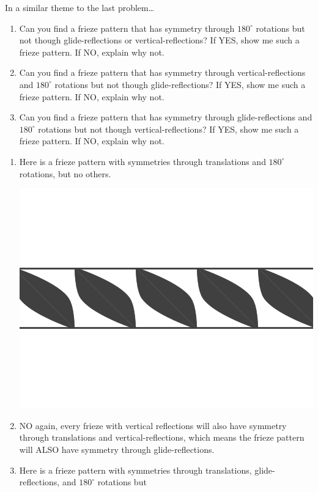 \documentclass[noauthor,nooutcomes,12pt,hints,handout]{ximera}
\begin{document}
\begin{question}
  In a similar theme to the last problem\dots 
  \begin{enumerate}
    \item Can you find a frieze pattern that has symmetry through
      $180^\circ$ rotations but not though glide-reflections or
      vertical-reflections? If YES, show me such a frieze pattern. If
      NO, explain why not.
      
    \item Can you find a frieze pattern that has symmetry through
      vertical-reflections and $180^\circ$ rotations but not though
      glide-reflections? If YES, show me such a frieze pattern. If NO,
      explain why not.

    \item Can you find a frieze pattern that has symmetry through
      glide-reflections and $180^\circ$ rotations but not though
      vertical-reflections? If YES, show me such a frieze pattern. If
      NO, explain why not.
  \end{enumerate}
  \begin{freeResponse}
    \begin{enumerate}
    \item Here is a frieze pattern with symmetries through
      translations and $180^\circ$ rotations, but no others.
      \begin{center}
        \includegraphics[width=.6\textwidth]{ansR.png}
      \end{center}
    \item NO again, every frieze with vertical reflections will also
      have symmetry through translations and vertical-reflections,
      which means the frieze pattern will ALSO have symmetry through
      glide-reflections.
    \item Here is a frieze pattern with symmetries through
      translations, glide-reflections, and $180^\circ$ rotations but

\end{enumerate}
\end{freeResponse}
\end{question}
\end{document}
